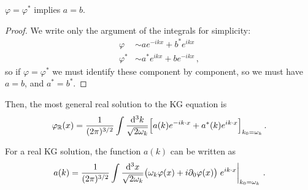 \documentclass[main.tex]{subfiles}
\begin{document}
\begin{claim}
\(\varphi = \varphi^{*}\) implies \(a = b\).
\end{claim}
\begin{proof}
We write only the argument of the integrals for simplicity: 
%
\begin{subequations}
\begin{align}
\varphi &\sim a e^{-ikx} + b^{*} e^{ikx}  \\
\varphi^{*} &\sim a^{*} e^{ikx} + b e^{-ikx}
\,,
\end{align}
\end{subequations}
%
so if \(\varphi = \varphi^{*}\) we must identify these component by component, so we must have \(a= b\), and \(a^{*} = b^{*}\).
\end{proof}

Then, the most general real solution to the KG equation is 
%
\begin{align}
\varphi_{\mathbb{R}} (x) = \frac{1}{(2 \pi)^{3/2}} 
\int \frac{ \dd[3]{k}}{\sqrt{2 \omega_{k}}}
\qty[a(k) e^{-ik \cdot x} + a^{*} (k) e^{i k \cdot x}]_{k_0 = \omega_{k}}
\,.
\end{align}

\begin{claim}
For a real KG solution, the function \(a(k)\) can be written as 
%
\begin{align}
a(k) = \frac{1}{(2 \pi  )^{3/2}} \int \frac{ \dd[3]{x}}{\sqrt{2 \omega_{k}}} \qty(\omega_{k} \varphi(x) +i \partial_{0} \varphi (x)) \eval{e^{i k \cdot x} }_{k_0 = \omega_{k}} 
\,.
\end{align}
\end{claim}
\end{document}

